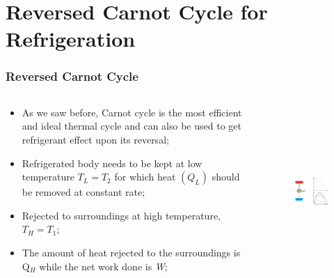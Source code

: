 \documentclass[10pt,compress,handout,ignorenonframetext]{beamer}
\begin{document}
\section{Reversed Carnot Cycle for Refrigeration}
\begin{frame}
 \frametitle{Reversed Carnot Cycle}
  \begin{columns}
   \begin{column}[c]{0.45\linewidth}
    \begin{itemize}
     \item <1-> As we saw before, Carnot cycle is the most efficient and ideal thermal cycle and can also be used to get refrigerant effect upon its reversal;
     \item <2-> Refrigerated body needs to be kept at low temperature $T_{L}=T_{2}$ for which heat $\left(Q_{L}\right)$ should be removed at constant rate;
     \item <3-> Rejected to surroundings at high temperature, $T_{H}=T_{1}$;
     \item <4-> The amount of heat rejected to the surroundings is Q$_{H}$ while the net work done is {\it W};
    \end{itemize}
   \end{column}
   \begin{column}[c]{0.55\linewidth}
    \begin{figure}%
     \begin{center}
      \includegraphics[width=6.8cm,height=6.5cm]{./Pics/Overview_Refrig4}
     \end{center}
    \end{figure}  
   \end{column}  
  \end{columns}
\end{frame}
\end{document}
